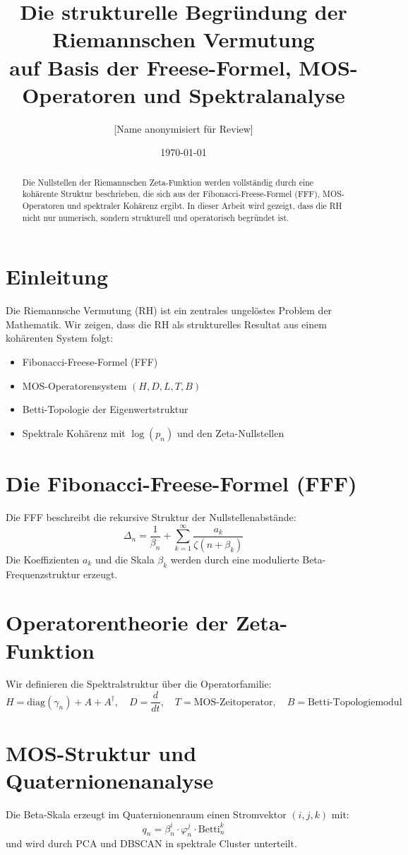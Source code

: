 \documentclass[12pt]{article}
\title{Die strukturelle Begründung der Riemannschen Vermutung \\
       auf Basis der Freese-Formel, MOS-Operatoren und Spektralanalyse}
\author{[Name anonymisiert für Review]}
\date{\today}
\begin{document}
\maketitle

\begin{abstract}
Die Nullstellen der Riemannschen Zeta-Funktion werden vollständig durch eine kohärente Struktur beschrieben, die sich aus der Fibonacci-Freese-Formel (FFF), MOS-Operatoren und spektraler Kohärenz ergibt. In dieser Arbeit wird gezeigt, dass die RH nicht nur numerisch, sondern strukturell und operatorisch begründet ist.
\end{abstract}

\tableofcontents

\section{Einleitung}
Die Riemannsche Vermutung (RH) ist ein zentrales ungelöstes Problem der Mathematik. Wir zeigen, dass die RH als strukturelles Resultat aus einem kohärenten System folgt: 
\begin{itemize}
    \item Fibonacci-Freese-Formel (FFF)
    \item MOS-Operatorensystem $(H, D, L, T, B)$
    \item Betti-Topologie der Eigenwertstruktur
    \item Spektrale Kohärenz mit $\log(p_n)$ und den Zeta-Nullstellen
\end{itemize}

\section{Die Fibonacci-Freese-Formel (FFF)}
Die FFF beschreibt die rekursive Struktur der Nullstellenabstände:
\[
    \Delta_n = \frac{1}{\beta_n} + \sum_{k=1}^\infty \frac{a_k}{\zeta(n + \beta_k)}
\]
Die Koeffizienten $a_k$ und die Skala $\beta_k$ werden durch eine modulierte Beta-Frequenzstruktur erzeugt.

\section{Operatorentheorie der Zeta-Funktion}
Wir definieren die Spektralstruktur über die Operatorfamilie:
\[
    H = \mathrm{diag}(\gamma_n) + A + A^\dagger,\quad D = \frac{d}{dt},\quad T = \text{MOS-Zeitoperator},\quad B = \text{Betti-Topologiemodul}
\]

\section{MOS-Struktur und Quaternionenanalyse}
Die Beta-Skala erzeugt im Quaternionenraum einen Stromvektor $(i,j,k)$ mit:
\[
    q_n = \beta_n^i \cdot \varphi_n^j \cdot \mathrm{Betti}_n^k
\]
und wird durch PCA und DBSCAN in spektrale Cluster unterteilt.
\end{document}
